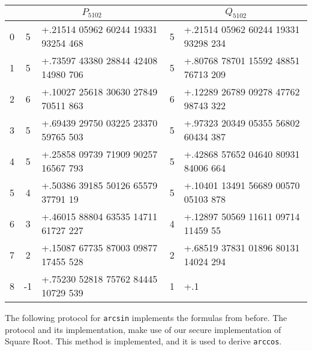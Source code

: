 \begin{center}
  \begin{tabular}{|c||c|l||c|l|}
    \hline
      & \multicolumn{2}{c||}{$P_{5102}$} & \multicolumn{2}{c|}{$Q_{5102}$}                                               \\
    \hline
    0 & 5                                & +.21514 05962 60244 19331 93254 468 & 5 & +.21514 05962 60244 19331 93298 234 \\
    1 & 5                                & +.73597 43380 28844 42408 14980 706 & 5 & +.80768 78701 15592 48851 76713 209 \\
    2 & 6                                & +.10027 25618 30630 27849 70511 863 & 6 & +.12289 26789 09278 47762 98743 322 \\
    3 & 5                                & +.69439 29750 03225 23370 59765 503 & 5 & +.97323 20349 05355 56802 60434 387 \\
    4 & 5                                & +.25858 09739 71909 90257 16567 793 & 5 & +.42868 57652 04640 80931 84006 664 \\
    5 & 4                                & +.50386 39185 50126 65579 37791 19  & 5 & +.10401 13491 56689 00570 05103 878 \\
    6 & 3                                & +.46015 88804 63535 14711 61727 227 & 4 & +.12897 50569 11611 09714 11459 55  \\
    7 & 2                                & +.15087 67735 87003 09877 17455 528 & 2 & +.68519 37831 01896 80131 14024 294 \\
    8 & -1                               & +.75230 52818 75762 84445 10729 539 & 1 & +.1                                 \\
    \hline
  \end{tabular}
\end{center}

The following protocol for \verb|arcsin| implements the formulas from before.
The protocol and its implementation, make use of our secure implementation of Square Root.
This method is implemented, and it is used to derive \verb|arccos|.

